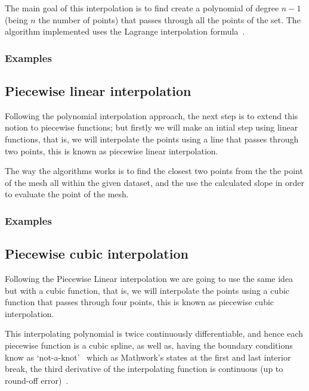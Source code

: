 The main goal of this interpolation is to find create a polynomial of degree $n-1$ (being $n$ the number of points) that passes through all the points of the set. The algorithm implemented uses the Lagrange interpolation formula~\cite{mathworldLagrange}.
\subsubsection{Examples}
	


\subsection{Piecewise linear interpolation}
Following the polynomial interpolation approach, the next step is to extend this notion to piecewise functions; but firstly we will make an intial step using linear functions, that is, we will interpolate the points using a line that passes through two points, this is known as piecewise linear interpolation. 

The way the algorithms works is to find the closest two points from the the point of the mesh all within the given dataset, and the use the calculated slope in order to evaluate the point of the mesh.

\subsubsection{Examples}
	

\subsection{Piecewise cubic interpolation}
Following the Piecewise Linear interpolation we are going to use the same idea but with a cubic function, that is, we will interpolate the points using a cubic function that passes through four points, this is known as piecewise cubic interpolation. 

This interpolating polynomial is twice continuously differentiable, and hence each piecewise function is a cubic spline, as well as, having the boundary conditions know as `not-a-knot'~\cite{doi:10.1137/1.9780898717952} which as Mathwork's states at the first and last interior break, the third derivative of the interpolating function is continuous (up to round-off error)~\cite{notAknot}.


